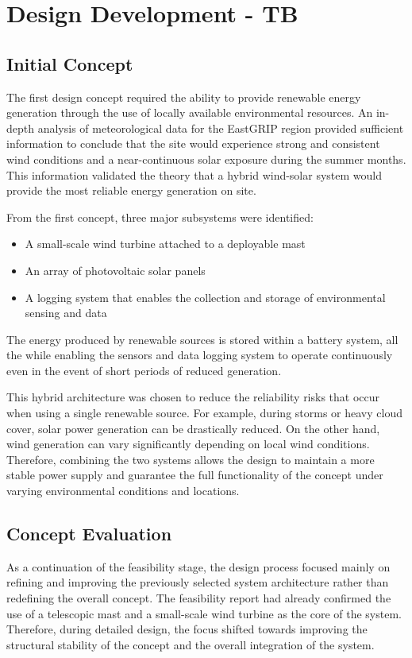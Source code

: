 \documentclass[11pt,a4paper]{article}
\begin{document}
\section{Design Development - TB}
\subsection{Initial Concept}
The first design concept required the ability to provide renewable energy generation through the use of locally available environmental resources. An in-depth analysis of meteorological data for the EastGRIP region provided sufficient information to conclude that the site would experience strong and consistent wind conditions and a near-continuous solar exposure during the summer months. This information validated the theory that a hybrid wind-solar system would provide the most reliable energy generation on site.

From the first concept, three major subsystems were identified:
\begin{itemize}
\item A small-scale wind turbine attached to a deployable mast
\item An array of photovoltaic solar panels
\item A logging system that enables the collection and storage of environmental sensing and data 
\end{itemize}

The energy produced by renewable sources is stored within a battery system, all the while enabling the sensors and data logging system to operate continuously even in the event of short periods of reduced generation.

This hybrid architecture was chosen to reduce the reliability risks that occur when using a single renewable source. For example, during storms or heavy cloud cover, solar power generation can be drastically reduced. On the other hand, wind generation can vary significantly depending on local wind conditions. Therefore, combining the two systems allows the design to maintain a more stable power supply and guarantee the full functionality of the concept under varying environmental conditions and locations.

\subsection{Concept Evaluation}
As a continuation of the feasibility stage, the design process focused mainly on refining and improving the previously selected system architecture rather than redefining the overall concept. The feasibility report had already confirmed the use of a telescopic mast and a small-scale wind turbine as the core of the system. Therefore, during detailed design, the focus shifted towards improving the structural stability of the concept and the overall integration of the system.
\end{document}
